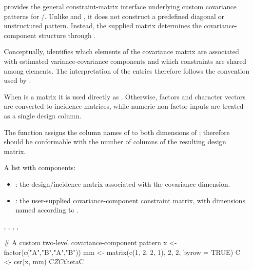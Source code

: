 \documentclass[a4paper]{book}
\begin{document}
%
\begin{Details}\relax
{} provides the general constraint-matrix interface underlying custom covariance patterns for /. Unlike  and , it does not construct a predefined diagonal or unstructured pattern. Instead, the supplied matrix  determines the covariance-component structure through .

Conceptually,  identifies which elements of the covariance matrix are associated with estimated variance-covariance components and which constraints are shared among elements. The interpretation of the entries therefore follows the  convention used by .

When  is a matrix it is used directly as . Otherwise, factors and character vectors are converted to incidence matrices, while numeric non-factor inputs are treated as a single design column.

The function assigns the column names of  to both dimensions of ; therefore  should be conformable with the number of columns of the resulting design matrix.
\end{Details}
%
\begin{Value}
A list with components:
\begin{itemize}

\item{} : the design/incidence matrix associated with the covariance dimension.
\item{} : the user-supplied covariance-component constraint matrix, with dimensions named according to .

\end{itemize}

\end{Value}
%
\begin{SeeAlso}\relax
{}, , , ,
\end{SeeAlso}
%
\begin{Examples}
\begin{ExampleCode}
# A custom two-level covariance-component pattern
x <- factor(c("A","B","A","B"))
mm <- matrix(c(1, 2,
               2, 1), 2, 2, byrow = TRUE)
C <- csr(x, mm)
C$Z
C$thetaC
\end{ExampleCode}
\end{Examples}
\end{document}
